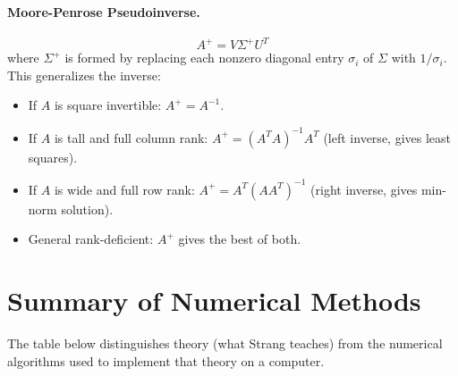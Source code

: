 \documentclass[12pt, a4paper]{article}
\newcommand{\Ap}{A^{+}}
\begin{document}
\paragraph{Moore-Penrose Pseudoinverse.}
\[
  \Ap = V\Sigma^+ U^T
\]
where $\Sigma^+$ is formed by replacing each nonzero diagonal entry $\sigma_i$
of $\Sigma$ with $1/\sigma_i$.  This generalizes the inverse:
\begin{itemize}[noitemsep]
  \item If $A$ is square invertible: $\Ap = A^{-1}$.
  \item If $A$ is tall and full column rank: $\Ap = (A^TA)^{-1}A^T$
        (left inverse, gives least squares).
  \item If $A$ is wide and full row rank: $\Ap = A^T(AA^T)^{-1}$
        (right inverse, gives min-norm solution).
  \item General rank-deficient: $\Ap$ gives the best of both.
\end{itemize}

\section{Summary of Numerical Methods}

The table below distinguishes theory (what Strang teaches) from the
numerical algorithms used to implement that theory on a computer.
\end{document}
